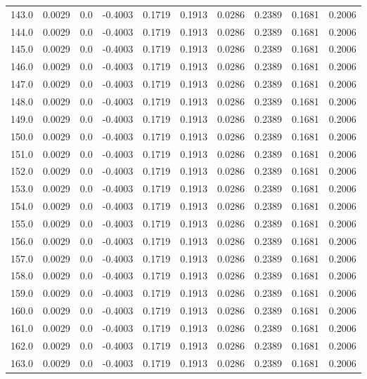 \begin{longtable}{lrrrrrrrrr}
143.0 & 0.0029 & 0.0 & -0.4003 & 0.1719 & 0.1913 & 0.0286 & 0.2389 & 0.1681 & 0.2006 \\
144.0 & 0.0029 & 0.0 & -0.4003 & 0.1719 & 0.1913 & 0.0286 & 0.2389 & 0.1681 & 0.2006 \\
145.0 & 0.0029 & 0.0 & -0.4003 & 0.1719 & 0.1913 & 0.0286 & 0.2389 & 0.1681 & 0.2006 \\
146.0 & 0.0029 & 0.0 & -0.4003 & 0.1719 & 0.1913 & 0.0286 & 0.2389 & 0.1681 & 0.2006 \\
147.0 & 0.0029 & 0.0 & -0.4003 & 0.1719 & 0.1913 & 0.0286 & 0.2389 & 0.1681 & 0.2006 \\
148.0 & 0.0029 & 0.0 & -0.4003 & 0.1719 & 0.1913 & 0.0286 & 0.2389 & 0.1681 & 0.2006 \\
149.0 & 0.0029 & 0.0 & -0.4003 & 0.1719 & 0.1913 & 0.0286 & 0.2389 & 0.1681 & 0.2006 \\
150.0 & 0.0029 & 0.0 & -0.4003 & 0.1719 & 0.1913 & 0.0286 & 0.2389 & 0.1681 & 0.2006 \\
151.0 & 0.0029 & 0.0 & -0.4003 & 0.1719 & 0.1913 & 0.0286 & 0.2389 & 0.1681 & 0.2006 \\
152.0 & 0.0029 & 0.0 & -0.4003 & 0.1719 & 0.1913 & 0.0286 & 0.2389 & 0.1681 & 0.2006 \\
153.0 & 0.0029 & 0.0 & -0.4003 & 0.1719 & 0.1913 & 0.0286 & 0.2389 & 0.1681 & 0.2006 \\
154.0 & 0.0029 & 0.0 & -0.4003 & 0.1719 & 0.1913 & 0.0286 & 0.2389 & 0.1681 & 0.2006 \\
155.0 & 0.0029 & 0.0 & -0.4003 & 0.1719 & 0.1913 & 0.0286 & 0.2389 & 0.1681 & 0.2006 \\
156.0 & 0.0029 & 0.0 & -0.4003 & 0.1719 & 0.1913 & 0.0286 & 0.2389 & 0.1681 & 0.2006 \\
157.0 & 0.0029 & 0.0 & -0.4003 & 0.1719 & 0.1913 & 0.0286 & 0.2389 & 0.1681 & 0.2006 \\
158.0 & 0.0029 & 0.0 & -0.4003 & 0.1719 & 0.1913 & 0.0286 & 0.2389 & 0.1681 & 0.2006 \\
159.0 & 0.0029 & 0.0 & -0.4003 & 0.1719 & 0.1913 & 0.0286 & 0.2389 & 0.1681 & 0.2006 \\
160.0 & 0.0029 & 0.0 & -0.4003 & 0.1719 & 0.1913 & 0.0286 & 0.2389 & 0.1681 & 0.2006 \\
161.0 & 0.0029 & 0.0 & -0.4003 & 0.1719 & 0.1913 & 0.0286 & 0.2389 & 0.1681 & 0.2006 \\
162.0 & 0.0029 & 0.0 & -0.4003 & 0.1719 & 0.1913 & 0.0286 & 0.2389 & 0.1681 & 0.2006 \\
163.0 & 0.0029 & 0.0 & -0.4003 & 0.1719 & 0.1913 & 0.0286 & 0.2389 & 0.1681 & 0.2006 \\

\end{longtable}
